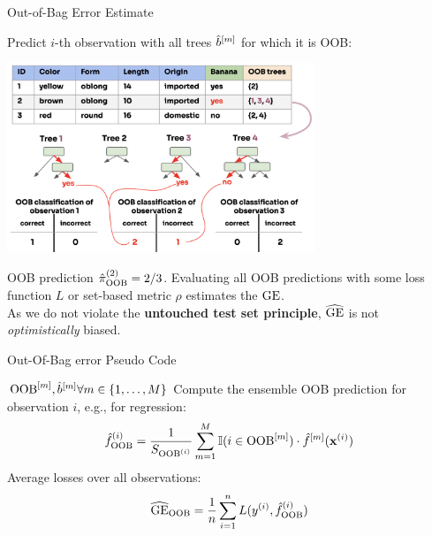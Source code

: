 \documentclass[11pt,compress,t,notes=noshow,xcolor=table]{beamer}
\begin{document}
\begin{vbframe}{Out-of-Bag Error Estimate}

Predict $i$-th observation with all trees $\hat{b}^{[m]}$ for which it is OOB:

\begin{center}
\includegraphics[width=0.69\textwidth]{figure_man/forest-oob-error.png}
\end{center}

OOB prediction $\hat{\pi}^{(2)}_{\mathrm{OOB}} = 2/3$.
Evaluating all OOB predictions with some loss function $L$ or set-based metric $\rho$ estimates the $\mathrm{GE}$.\\
As we do not violate the \textbf{untouched test set principle}, $\widehat{\mathrm{GE}}$ is not \textit{optimistically} biased.%
\end{vbframe}

\begin{vbframe}{Out-Of-Bag error Pseudo Code}
\begin{algorithm}[H]
  \footnotesize
  \caption*{Out-Of-Bag error estimation}
  \begin{algorithmic}[1]
     $\mathrm{OOB}^{[m]}, \hat{b}^{[m]} \forall m \in \{1, \dots, M\}$
      \State Compute the ensemble OOB prediction for observation $i$, e.g., for regression:
      $$\hat{f}^{(i)}_{\mathrm{OOB}} =
      \frac{1}{S_{\mathrm{OOB}^{(i)}}} \sum_{m=1}^M
      \mathbb{I}(i \in \mathrm{OOB}^{[m]}) \cdot \hat{f}^{[m]}(\mathbf{x}^{(i)}) $$
    \EndFor
    \State Average losses over all observations: $$\widehat{\mathrm{GE}}_{\mathrm{OOB}} = \frac{1}{n} \sum\limits_{i=1}^n L(y^{(i)}, \hat{f}^{(i)}_{\mathrm{OOB}})$$

  \end{algorithmic}
\end{algorithm}
\end{vbframe}
\end{document}
